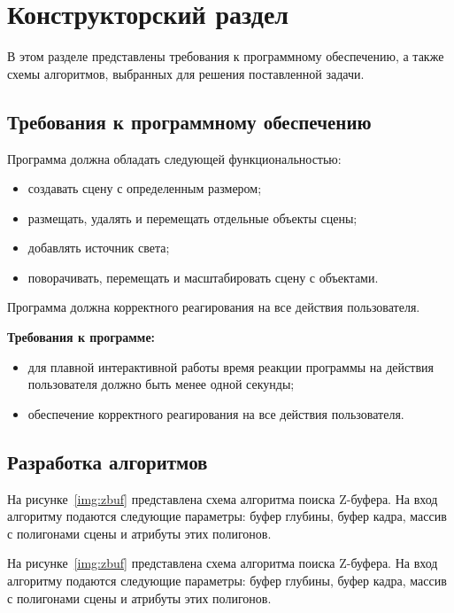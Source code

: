 \chapter{Конструкторский раздел}

В этом разделе представлены требования к программному обеспечению, а также схемы алгоритмов, выбранных для решения поставленной задачи.

\section{Требования к программному обеспечению}
Программа должна обладать следующей функциональностью:
\begin{itemize}
	\item создавать сцену с определенным размером;
	\item размещать, удалять и перемещать отдельные объекты сцены;
	\item добавлять источник света;
	\item поворачивать, перемещать и масштабировать сцену с объектами.
\end{itemize}

Программа должна корректного реагирования на все действия пользователя.

\textbf{Требования к программе: }
\begin{itemize}
	\item для плавной интерактивной работы время реакции программы на действия пользователя должно быть менее одной секунды;
	\item обеспечение корректного реагирования на все действия пользователя.
\end{itemize}
\fi 





\section{Разработка алгоритмов}

На рисунке~\ref{img:zbuf} представлена схема алгоритма поиска Z-буфера.
На вход алгоритму подаются следующие параметры: буфер глубины, буфер кадра,
массив с полигонами сцены и атрибуты этих полигонов.

На рисунке~\ref{img:zbuf} представлена схема алгоритма поиска Z-буфера.
На вход алгоритму подаются следующие параметры: буфер глубины, буфер кадра,
массив с полигонами сцены и атрибуты этих полигонов.


